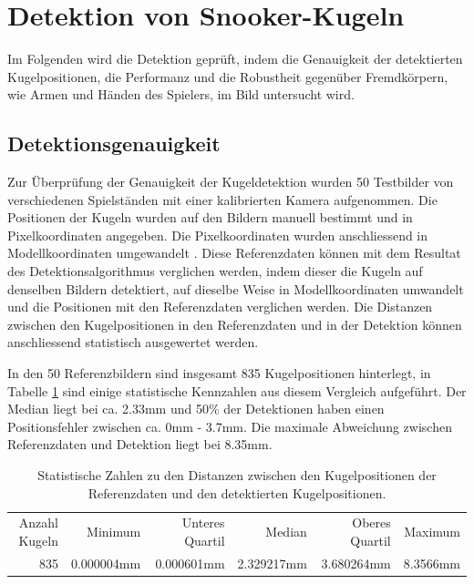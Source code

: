 \section{Detektion von Snooker-Kugeln}
Im Folgenden wird die Detektion geprüft, indem die Genauigkeit der detektierten Kugelpositionen, die Performanz und die
Robustheit gegenüber Fremdkörpern, wie Armen und Händen des Spielers, im Bild untersucht wird.

\subsection{Detektionsgenauigkeit}
Zur Überprüfung der Genauigkeit der Kugeldetektion wurden 50 Testbilder von verschiedenen Spielständen
mit einer kalibrierten Kamera aufgenommen.
Die Positionen der Kugeln wurden auf den Bildern manuell bestimmt und in Pixelkoordinaten angegeben.
Die Pixelkoordinaten wurden anschliessend in Modellkoordinaten umgewandelt \cite{project2:pixel_to_model_coordinates}.
Diese Referenzdaten können mit dem Resultat des Detektionsalgorithmus verglichen werden,
indem dieser die Kugeln auf denselben Bildern detektiert, auf dieselbe Weise in Modellkoordinaten umwandelt und
die Positionen mit den Referenzdaten verglichen werden.
Die Distanzen zwischen den Kugelpositionen in den Referenzdaten und in der Detektion können
anschliessend statistisch ausgewertet werden.

In den 50 Referenzbildern sind insgesamt 835 Kugelpositionen hinterlegt, in Tabelle \ref{tab:detektion_resultate_distanzen_stats}
sind einige statistische Kennzahlen aus diesem Vergleich aufgeführt. Der Median liegt bei ca. 2.33mm und 50\% der Detektionen
haben einen Positionsfehler zwischen ca. 0mm - 3.7mm.
Die maximale Abweichung zwischen Referenzdaten und Detektion liegt bei 8.35mm.

\begin{table}[ht]
    \begin{tabular}{ rrrrrr }
        \rowcolor{\seccolor!50}
        Anzahl Kugeln & Minimum & Unteres Quartil & Median & Oberes Quartil & Maximum\\
        835 & 0.000004mm & 0.000601mm & 2.329217mm & 3.680264mm & 8.3566mm
    \end{tabular}
    \caption{Statistische Zahlen zu den Distanzen zwischen den Kugelpositionen der Referenzdaten und den detektierten Kugelpositionen.}
    \label{tab:detektion_resultate_distanzen_stats}
\end{table}

